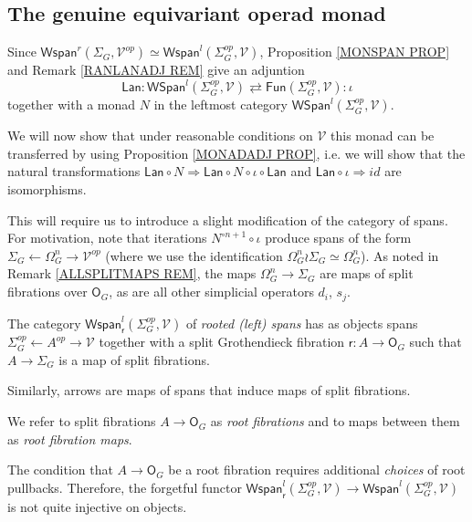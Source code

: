 \documentclass[a4paper,10pt]{article}%
\begin{document}
\subsection{The genuine equivariant operad monad} \label{FGMON SEC}


Since 
$\mathsf{Wspan}^r(\Sigma_G,\mathcal{V}^{op}) \simeq 
\mathsf{Wspan}^l(\Sigma_G^{op},\mathcal{V})$,
Proposition \ref{MONSPAN PROP} and Remark \ref{RANLANADJ REM} give an adjuntion
\[
	\mathsf{Lan} \colon
	\mathsf{WSpan}^l(\Sigma^{op}_G, \mathcal{V})
		\rightleftarrows
	\mathsf{Fun}(\Sigma^{op}_G, \mathcal{V})
	\colon \iota
\]
together with a monad $N$ in the leftmost category $\mathsf{WSpan}^l(\Sigma^{op}_G, \mathcal{V})$.


We will now show that under reasonable conditions on 
$\mathcal{V}$ this monad can be transferred by using 
Proposition \ref{MONADADJ PROP},
i.e. we will show that the natural transformations 
$
\mathsf{Lan} \circ N \Rightarrow \mathsf{Lan} \circ N \circ \iota \circ \mathsf{Lan}
$
and
$\mathsf{Lan} \circ \iota \Rightarrow id$
are isomorphisms.

This will require us to introduce a slight modification of the category of spans.
For motivation, note that iterations
$N^{\circ n+1} \circ \iota$ produce spans of the form
$\Sigma_G \leftarrow \Omega_G^{n} \to \mathcal{V}^{op}$
(where we use the identification $\Omega_G^{n} \wr \Sigma_G \simeq \Omega_G^{n}$). 
As noted in Remark \ref{ALLSPLITMAPS REM}, the maps 
$\Omega_G^{n} \to \Sigma_G$ are maps of split fibrations over $\mathsf{O}_G$, as are all other simplicial operators $d_i$, $s_j$.

\begin{definition}
The category $\mathsf{Wspan}^l_{\mathsf{r}}(\Sigma_G^{op},\mathcal{V})$ of \textit{rooted (left) spans}
has as objects spans
$\Sigma_G^{op} \leftarrow A^{op} \to \mathcal{V}$
together with a split Grothendieck fibration 
$\mathsf{r} \colon A \to \mathsf{O}_G$
such that $A \to \Sigma_G$ is a map of split fibrations.

Similarly, arrows are maps of spans that induce maps of split fibrations.
\end{definition}

We refer to split fibrations $A \to \mathsf{O}_G$
as \textit{root fibrations}
and to maps between them as \textit{root fibration maps}.

\begin{remark}
The condition that $A \to \mathsf{O}_G$
be a root fibration requires additional \textit{choices} of root pullbacks. Therefore, the forgetful functor 
$\mathsf{Wspan}^l_{\mathsf{r}}(\Sigma_G^{op},\mathcal{V})
\to
\mathsf{Wspan}^l(\Sigma_G^{op},\mathcal{V})$
is not quite injective on objects.
\end{remark}
\end{document}
